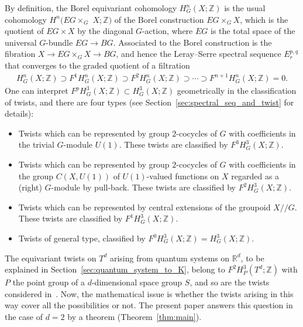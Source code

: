 \documentclass[pdftex]{sigma}
\theoremstyle{definition}
\newcommand{\R}{\mathbb{R}}
\newcommand{\Z}{\mathbb{Z}}
\begin{document}
By def\/inition, the Borel equivariant cohomology $H^n_G(X; \Z)$ is the usual cohomology $H^n(EG \!\times_G\!$ $X; \Z)$ of the Borel construction $EG \times_G X$, which is the quotient of $EG \times X$ by the diagonal $G$-action, where $EG$ is the total space of the universal $G$-bundle $EG \to BG$. Associated to the Borel construction is the f\/ibration $X \to EG \times_G X \to BG$, and hence the Leray--Serre spectral sequence $E_r^{p, q}$ that converges to the graded quotient of a f\/iltration
\begin{gather*}
H^n_G(X; \Z) \supset F^1H^n_G(X; \Z) \supset F^2H^n_G(X; \Z) \supset \cdots
\supset F^{n+1}H^n_G(X; \Z) = 0.
\end{gather*}
One can interpret $F^pH^3_G(X; \Z) \subset H^3_G(X; \Z)$ geometrically in the classif\/ication of twists, and there are four types (see Section~\ref{sec:spectral_seq_and_twist} for details):

\begin{itemize}\itemsep=0pt
\item[(i)]
Twists which can be represented by group $2$-cocycles of $G$ with coef\/f\/icients in the trivial $G$-module $U(1)$. These twists are classif\/ied by $F^3H^3_G(X; \Z)$.

\item[(ii)]
Twists which can be represented by group $2$-cocycles of $G$ with coef\/f\/icients in the group $C(X, U(1))$ of $U(1)$-valued functions on $X$ regarded as a (right) $G$-module by pull-back. These twists are classif\/ied by $F^2H^3_G(X; \Z)$.

\item[(iii)]
Twists which can be represented by central extensions of the groupoid $X/\!/G$. These twists are classif\/ied by $F^1H^3_G(X; \Z)$.


\item[(iv)]
Twists of general type, classif\/ied by $F^0H^3_G(X; \Z) = H^3_G(X; \Z)$.
\end{itemize}

The equivariant twists on $T^d$ arising from quantum systems on $\R^d$, to be explained in Section~\ref{sec:quantum_system_to_K}, belong to $F^2H^3_P(T^d; \Z)$ with $P$ the point group of a $d$-dimensional space group $S$, and so are the twists considered in~\cite{SSG2}. Now, the mathematical issue is whether the twists arising in this way cover all the possibilities or not. The present paper answers this question in the case of $d = 2$ by a theorem (Theorem~\ref{thm:main}).
\end{document}
